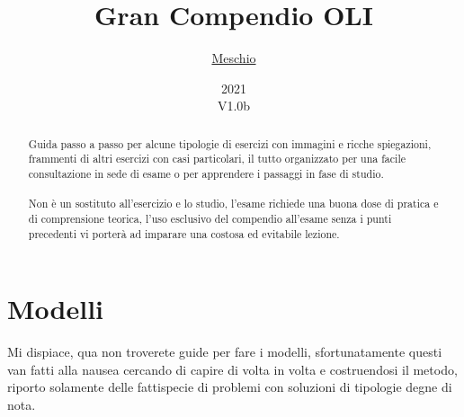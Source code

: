 \documentclass{article}
\title{Gran Compendio OLI}
\author{\href{https://github.com/meschio94/Gran-Compendio-OLI}{Meschio}}
\date{2021\\V1.0b}
\begin{document}
\maketitle

\begin{abstract}
Guida passo a passo per alcune tipologie di esercizi con immagini e ricche spiegazioni, frammenti di altri esercizi con casi particolari, il tutto organizzato per una facile consultazione in sede di esame o per apprendere i passaggi in fase di studio.\\
\\
Non è un sostituto all'esercizio e lo studio, l'esame richiede una buona dose di pratica e di comprensione teorica, l'uso esclusivo del compendio all'esame senza i punti precedenti vi porterà ad imparare una costosa ed evitabile lezione.
\end{abstract}

\tableofcontents

\section{Modelli}
Mi dispiace, qua non troverete guide per fare i modelli, sfortunatamente questi van fatti alla nausea cercando di capire di volta in volta e costruendosi il metodo, riporto solamente delle fattispecie di problemi con soluzioni di tipologie degne di nota.
\end{document}
